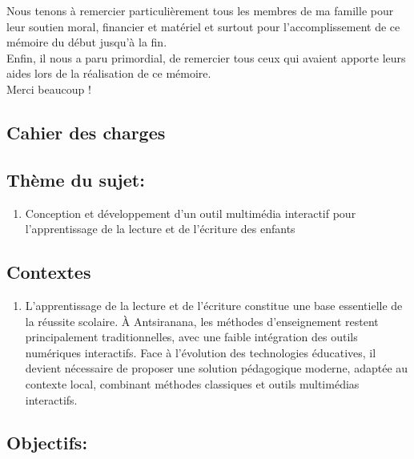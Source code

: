 \documentclass[a4paper,oneside,12pt]{book}
\begin{document}
Nous tenons à remercier particulièrement tous les membres de ma famille pour leur soutien moral, financier et matériel et surtout pour l’accomplissement de ce mémoire du début jusqu’à la fin.\\
Enfin, il nous a paru primordial, de remercier tous ceux qui avaient apporte leurs aides lors de la réalisation de ce mémoire.\\
Merci beaucoup !
\\


\begin{center}
	\chapter*{Cahier des charges}
\end{center}
\section*{Thème du sujet:}
\begin{enumerate}
\item [$\Rightarrow$] {Conception et développement d’un outil multimédia interactif pour l’apprentissage de la lecture et de l’écriture des enfants }
\end{enumerate}
\section*{Contextes}
\begin{enumerate}
\item [$\Rightarrow$]L’apprentissage de la lecture et de l’écriture constitue une base essentielle de la réussite scolaire. À Antsiranana, les méthodes d’enseignement restent principalement traditionnelles, avec une faible intégration des outils numériques interactifs. Face à l’évolution des technologies éducatives, il devient nécessaire de proposer une solution pédagogique moderne, adaptée au contexte local, combinant méthodes classiques et outils multimédias interactifs.
\end{enumerate}
\section*{Objectifs:}
\end{document}
